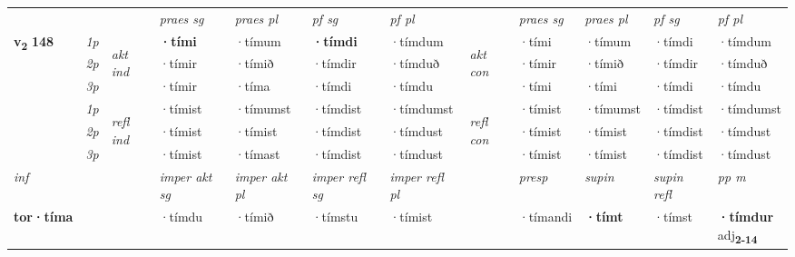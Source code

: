 \begin{longtable}[l]{X>{\footnotesize\itshape}llXXXXlXXXX}
 & &   & \textit{praes sg}  & \textit{praes pl}    & \textit{ pf sg} & \textit{pf pl} & & \textit{praes sg}  & \textit{praes pl}    & \textit{pf sg} & \textit{pf pl }  \\ \cmidrule{4-7} \cmidrule{9-12}
 \multirow{2}{*}{{{\textbf{v{\textsubscript{2}}} \Large{\textbf{148}}}}}  & 1p & \multirow{3}{*}{\begin{turn}{90}\textit{akt ind}\end{turn}} & \textbf{·tími} & ·tímum & \textbf{·tímdi} & ·tímdum & \multirow{3}{*}{\begin{turn}{90}\textit{akt con}\end{turn}} &·tími & ·tímum & ·tímdi & ·tímdum\\*
 & 2p &  &  ·tímir  & ·tímið & ·tímdir & ·tímduð & & ·tímir & ·tímið & ·tímdir & ·tímduð \\*
 & 3p &  & ·tímir & ·tíma & ·tímdi & ·tímdu & & ·tími & ·tími& ·tímdi & ·tímdu \\*
\cmidrule{4-7} \cmidrule{9-12}
 & 1p & \multirow{3}{*}{\begin{turn}{90}\textit{refl ind}\end{turn}}  & ·tímist & ·tímumst & ·tímdist & ·tímdumst & \multirow{3}{*}{\begin{turn}{90}\textit{refl con}\end{turn}}  &·tímist & ·tímumst & ·tímdist & ·tímdumst \\*
 & 2p &  & ·tímist & ·tímist & ·tímdist & ·tímdust & &·tímist & ·tímist & ·tímdist & ·tímdust \\*
 & 3p  & & ·tímist & ·tímast & ·tímdist & ·tímdust & & ·tímist & ·tímist& ·tímdist & ·tímdust \\*
\cmidrule{4-7} \cmidrule{9-12}

   {\textit{inf}} & &  & \textit{imper akt sg} & \textit{imper akt pl} & \textit{imper refl sg} & \textit{imper refl pl} && \textit{presp} & \textit{supin} & \textit{supin refl} & \textit{pp m} \\*
  {\textbf{tor\allowbreak ·tíma}} & && ·tímdu  & ·tímið & ·tímstu & ·tímist && ·tímandi &  \textbf{·tímt} & ·tímst & \specialcell{\textbf{·tímdur} \\ adj\textbf{\textsubscript{2-14}}} \\*

\midrule


\end{longtable}
